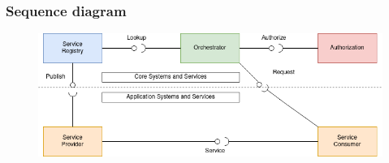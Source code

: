 \begin{frame}
    \frametitle{Sequence diagram}
    \begin{figure}
        \includegraphics[width=\textwidth]{frames/images/Untitled Diagram.png}
        \end{figure}
\end{frame}